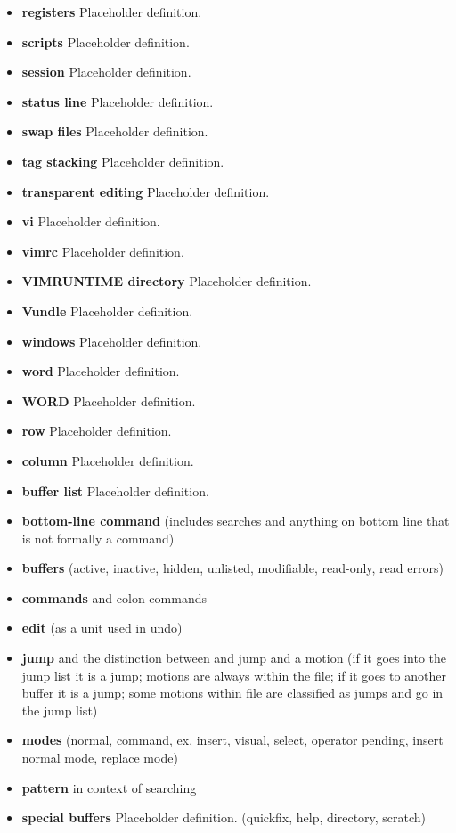 \documentclass[12pt, oneside]{book}
\begin{document}
\begin{itemize}[leftmargin=*, label={}]
  \item \textbf{registers} Placeholder definition.
  \item \textbf{scripts} Placeholder definition.
  \item \textbf{session} Placeholder definition.
  \item \textbf{status line} Placeholder definition.
  \item \textbf{swap files} Placeholder definition.
  \item \textbf{tag stacking} Placeholder definition.
  \item \textbf{transparent editing} Placeholder definition.
  \item \textbf{vi} Placeholder definition.
  \item \textbf{vimrc} Placeholder definition.
  \item \textbf{VIMRUNTIME directory} Placeholder definition.
  \item \textbf{Vundle} Placeholder definition.
  \item \textbf{windows} Placeholder definition.
  \item \textbf{word} Placeholder definition.
  \item \textbf{WORD} Placeholder definition.
  \item \textbf{row} Placeholder definition.
  \item \textbf{column} Placeholder definition.
  \item \textbf{buffer list} Placeholder definition.
  \item \textbf{bottom-line command} (includes searches and anything on bottom line that is not formally a command)
  \item \textbf{buffers} (active, inactive, hidden, unlisted, modifiable, read-only, read errors)
  \item \textbf{commands} and colon commands
  \item \textbf{edit} (as a unit used in undo)
  \item \textbf{jump} and the distinction between and jump and a motion (if it goes into the jump list it is a jump; motions are always within the file; if it goes to another buffer it is a jump; some motions within file are classified as jumps and go in the jump list)
  \item \textbf{modes} (normal, command, ex, insert, visual, select, operator pending, insert normal mode, replace mode)
  \item \textbf{pattern} in context of searching
  \item \textbf{special buffers} Placeholder definition.  (quickfix, help, directory, scratch)

\end{itemize}
\end{document}

